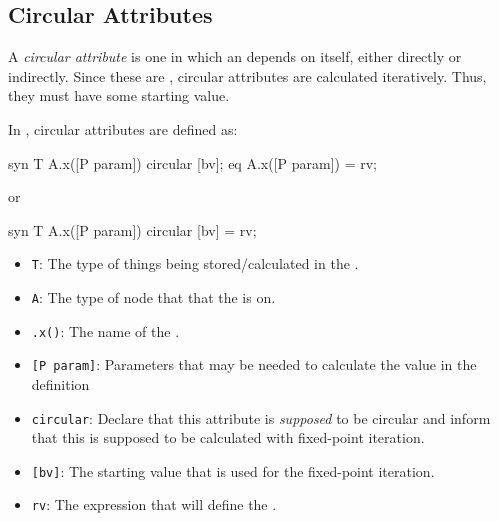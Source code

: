 \subsection{Circular Attributes}\label{subsec:Circular_Attributes}
\begin{definition}\label{def:Circular_Attribute}
  A \emph{circular attribute} is one in which an  depends on itself, either directly or indirectly.
  Since these are , circular attributes are calculated iteratively.
  Thus, they must have some starting value.

  In \JastAdd{}, circular attributes are defined as:
\begin{javasource}
  syn T A.x([P param]) circular [bv];
  eq A.x([P param]) = rv;
\end{javasource}
  or
\begin{javasource}
  syn T A.x([P param]) circular [bv] = rv;
\end{javasource}
  \begin{itemize}[noitemsep]
  \item \texttt{T}: The type of things being stored/calculated in the .
  \item \texttt{A}: The type of  node that that the  is on.
  \item \texttt{.x()}: The name of the .
  \item \texttt{[P param]}: Parameters that may be needed to calculate the value in the definition
  \item \texttt{circular}: Declare that this attribute is \emph{supposed} to be circular and inform \JastAdd{} that this is supposed to be calculated with fixed-point iteration.
  \item \texttt{[bv]}: The starting value that is used for the fixed-point iteration.
  \item \texttt{rv}: The expression that will define the .
  \end{itemize}
\end{definition}

